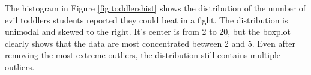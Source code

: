 \documentclass{article}
\begin{document}
\begin{figure}[ht]
\end{figure}

The histogram in Figure \ref{fig:toddlershist} shows the distribution of the
number of evil toddlers students reported they could beat in a fight. The
distribution is unimodal and skewed to the right. It's center is from 2 to 20,
but the boxplot clearly shows that the data are most concentrated between 2 and
5. Even after removing the most extreme outliers, the distribution still
contains multiple outliers.
\end{document}
